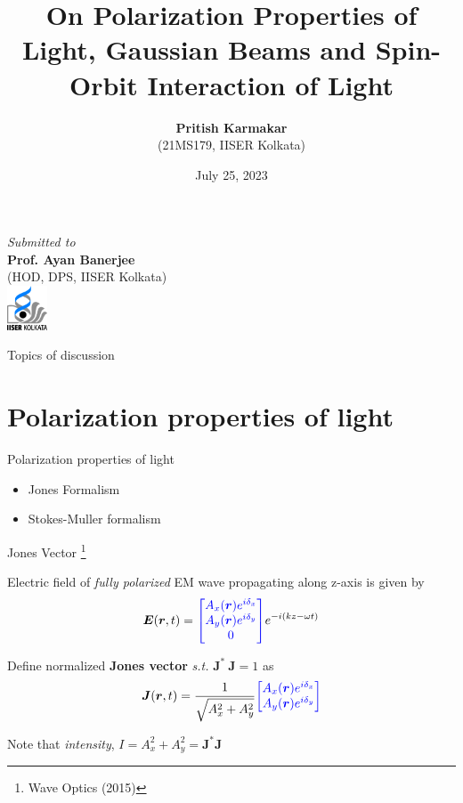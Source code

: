 \documentclass[12pt, dvipsnames]{beamer}
\numberwithin{equation}{section}
\newcommand\blfootnote[1]{%
	\begingroup
	\renewcommand\thefootnote{}\footnote{#1}%
	\addtocounter{footnote}{-1}%
	\endgroup
}
\renewcommand{\footnotesize}{\scriptsize}
\begin{document}
	\author{\textbf{Pritish Karmakar}\\{\footnotesize(21MS179, IISER Kolkata)}}
	\title{{On Polarization Properties of Light, Gaussian Beams and Spin-Orbit Interaction of Light}}
	\date{July 25, 2023}
\begin{frame}[plain]
	\maketitle
	\centering
	\textsl{\small Submitted to}\\
	\textbf{\small Prof. Ayan Banerjee}\\
	{\scriptsize (HOD, DPS, IISER Kolkata)}\\
	\includegraphics[width=1.2cm]{iiserk.png}
\end{frame}
	
\begin{frame}{Topics of discussion}
	\tableofcontents
\end{frame}

\section{Polarization properties of light}

\begin{frame}
	\centering
	\alert{\huge Polarization properties of light}
	\begin{itemize}\Large
		\item<1>Jones Formalism
		\item<0>Stokes-Muller formalism
	\end{itemize}
\end{frame}

\begin{frame}{Jones Vector}\blfootnote{Wave Optics (2015)}
	Electric field of \textit{fully polarized} EM wave propagating along z-axis is given by
	\begin{align*}
		\boldsymbol{E}(\boldsymbol{r},t)=
		{\color{blue}\begin{bmatrix}
			A_x(\boldsymbol{r})e^{i\delta_x}\\
			A_y(\boldsymbol{r})e^{i\delta_y}\\
			0
		\end{bmatrix}}e^{-i(kz-\omega t)}
	\end{align*}\pause

	Define normalized \textbf{Jones vector} \textit{s.t.} $\boldsymbol{J}^\ast\:\boldsymbol{J}=1$  as
	\begin{align*}
		\boldsymbol{J}(\boldsymbol{r},t)=\frac{1}{\sqrt{A_x^2+A_y^2}}
		{\color{blue}\begin{bmatrix}
			A_x(\boldsymbol{r})e^{i\delta_x}\\
			A_y(\boldsymbol{r})e^{i\delta_y}
		\end{bmatrix}}
	\end{align*}\pause

Note that \textit{intensity}, $I= A_x^2+A_y^2 =  \boldsymbol{J}^\ast \boldsymbol{J}$
\end{frame}
\end{document}

